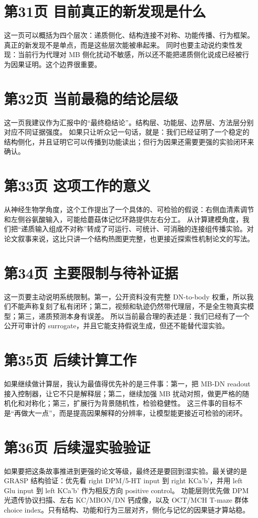 \documentclass[11pt,fontset=none]{ctexart}
\begin{document}
\section*{第31页 目前真正的新发现是什么}
这一页可以概括为四个层次：递质侧化、结构连接不对称、功能传播、行为框架。真正的新发现不是单点，而是这些层次能被串起来。
同时也要主动说约束性发现：当前行为代理对 MB 侧化扰动不敏感，所以还不能把递质侧化说成已经被行为因果证明。这个边界很重要。
\section*{第32页 当前最稳的结论层级}
这一页我建议作为汇报中的“最终稳结论”。结构层、功能层、边界层、方法层分别对应不同证据强度。
如果只让听众记一句话，就是：我们已经证明了一个稳定的结构侧化，并且证明它可以传播到功能读出；但行为因果还需要更强的实验闭环来确认。
\section*{第33页 这项工作的意义}
从神经生物学角度，这个工作提出了一个具体的、可检验的假说：右侧血清素调节和左侧谷氨酸输入，可能给蘑菇体记忆环路提供左右分工。
从计算建模角度，我们把“递质输入组成不对称”转成了可运行、可统计、可消融的连接组传播实验。对论文叙事来说，这比只讲一个结构热图更完整，也更接近探索性机制论文的写法。
\section*{第34页 主要限制与待补证据}
这一页要主动说明系统限制。第一，公开资料没有完整 DN-to-body 权重，所以我们不能声称复刻了私有闭环；第二，视频和轨迹仍然带代理层，不是全生物真实模型；第三，递质预测本身有误差。
所以当前最合理的表述是：我们已经有了一个公开可审计的 surrogate，并且它能支持假说生成，但还不能替代湿实验。
\section*{第35页 后续计算工作}
如果继续做计算层，我认为最值得优先补的是三件事：第一，把 MB-DN readout 接入控制器，让它不只是解释层；第二，继续加强 MB 扰动对照，做更严格的随机化和对称化；第三，扩展行为背景随机性，检验稳健性。
这三件事的目标不是“再做大一点”，而是提高因果解释的分辨率，让模型能更接近可检验的闭环。
\section*{第36页 后续湿实验验证}
如果要把这条故事推进到更强的论文等级，最终还是要回到湿实验。最关键的是 GRASP 结构验证：优先看 right DPM/5-HT input 到 right KCa'b'，并用 left Glu input 到 left KCa'b' 作为相反方向 positive control。
功能层则优先做 DPM 光遗传协议扫描、左右 KC/MBON/DN 钙成像，以及 OCT/MCH T-maze 群体 choice index。只有结构、功能和行为三层对齐，侧化与记忆的因果链才算站稳。
\end{document}
